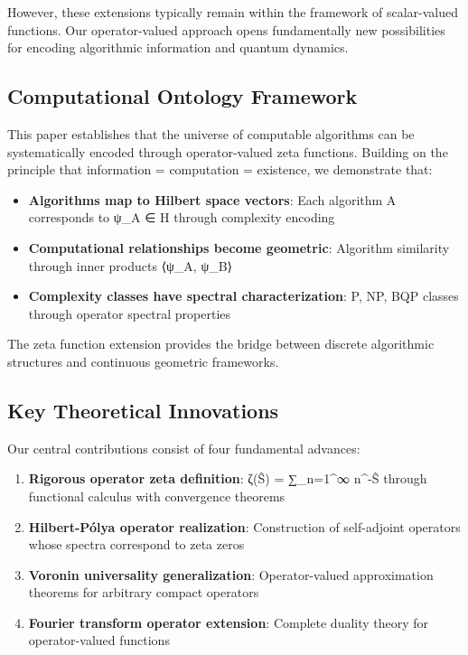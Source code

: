 \documentclass[12pt]{article}
\theoremstyle{plain}
\theoremstyle{definition}
\begin{document}
However, these extensions typically remain within the framework of scalar-valued functions. Our operator-valued approach opens fundamentally new possibilities for encoding algorithmic information and quantum dynamics.

\subsection{Computational Ontology Framework}

This paper establishes that the universe of computable algorithms can be systematically encoded through operator-valued zeta functions. Building on the principle that information = computation = existence, we demonstrate that:

\begin{itemize}
\item \textbf{Algorithms map to Hilbert space vectors}: Each algorithm A corresponds to ψ_A ∈ H through complexity encoding
\item \textbf{Computational relationships become geometric}: Algorithm similarity through inner products ⟨ψ_A, ψ_B⟩
\item \textbf{Complexity classes have spectral characterization}: P, NP, BQP classes through operator spectral properties
\end{itemize}

The zeta function extension provides the bridge between discrete algorithmic structures and continuous geometric frameworks.

\subsection{Key Theoretical Innovations}

Our central contributions consist of four fundamental advances:

\begin{enumerate}
\item \textbf{Rigorous operator zeta definition}: ζ(Ŝ) = ∑_{n=1}^∞ n^{-Ŝ} through functional calculus with convergence theorems
\item \textbf{Hilbert-Pólya operator realization}: Construction of self-adjoint operators whose spectra correspond to zeta zeros
\item \textbf{Voronin universality generalization}: Operator-valued approximation theorems for arbitrary compact operators
\item \textbf{Fourier transform operator extension}: Complete duality theory for operator-valued functions
\end{enumerate}
\end{document}

